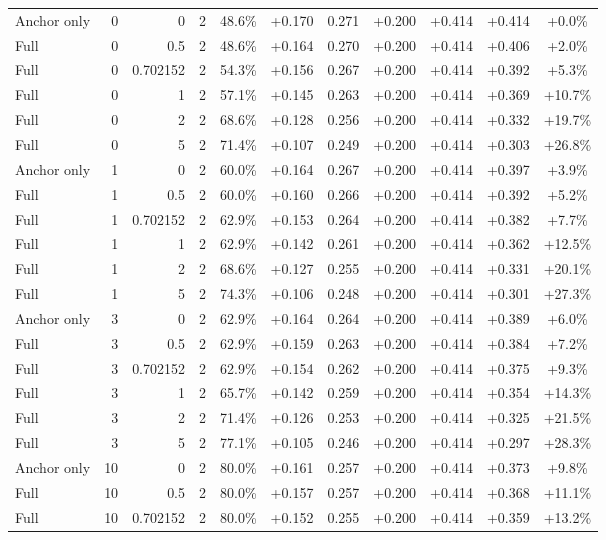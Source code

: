 \begin{table}[htbp]
\begin{tabular}{lrrrccccccc}
Anchor only & 0 & 0 & 2 & 48.6\% & +0.170 & 0.271 & +0.200 & +0.414 & +0.414 & +0.0\% \\
Full & 0 & 0.5 & 2 & 48.6\% & +0.164 & 0.270 & +0.200 & +0.414 & +0.406 & +2.0\% \\
Full & 0 & 0.702152 & 2 & 54.3\% & +0.156 & 0.267 & +0.200 & +0.414 & +0.392 & +5.3\% \\
Full & 0 & 1 & 2 & 57.1\% & +0.145 & 0.263 & +0.200 & +0.414 & +0.369 & +10.7\% \\
Full & 0 & 2 & 2 & 68.6\% & +0.128 & 0.256 & +0.200 & +0.414 & +0.332 & +19.7\% \\
Full & 0 & 5 & 2 & 71.4\% & +0.107 & 0.249 & +0.200 & +0.414 & +0.303 & +26.8\% \\
Anchor only & 1 & 0 & 2 & 60.0\% & +0.164 & 0.267 & +0.200 & +0.414 & +0.397 & +3.9\% \\
Full & 1 & 0.5 & 2 & 60.0\% & +0.160 & 0.266 & +0.200 & +0.414 & +0.392 & +5.2\% \\
Full & 1 & 0.702152 & 2 & 62.9\% & +0.153 & 0.264 & +0.200 & +0.414 & +0.382 & +7.7\% \\
Full & 1 & 1 & 2 & 62.9\% & +0.142 & 0.261 & +0.200 & +0.414 & +0.362 & +12.5\% \\
Full & 1 & 2 & 2 & 68.6\% & +0.127 & 0.255 & +0.200 & +0.414 & +0.331 & +20.1\% \\
Full & 1 & 5 & 2 & 74.3\% & +0.106 & 0.248 & +0.200 & +0.414 & +0.301 & +27.3\% \\
Anchor only & 3 & 0 & 2 & 62.9\% & +0.164 & 0.264 & +0.200 & +0.414 & +0.389 & +6.0\% \\
Full & 3 & 0.5 & 2 & 62.9\% & +0.159 & 0.263 & +0.200 & +0.414 & +0.384 & +7.2\% \\
Full & 3 & 0.702152 & 2 & 62.9\% & +0.154 & 0.262 & +0.200 & +0.414 & +0.375 & +9.3\% \\
Full & 3 & 1 & 2 & 65.7\% & +0.142 & 0.259 & +0.200 & +0.414 & +0.354 & +14.3\% \\
Full & 3 & 2 & 2 & 71.4\% & +0.126 & 0.253 & +0.200 & +0.414 & +0.325 & +21.5\% \\
Full & 3 & 5 & 2 & 77.1\% & +0.105 & 0.246 & +0.200 & +0.414 & +0.297 & +28.3\% \\
Anchor only & 10 & 0 & 2 & 80.0\% & +0.161 & 0.257 & +0.200 & +0.414 & +0.373 & +9.8\% \\
Full & 10 & 0.5 & 2 & 80.0\% & +0.157 & 0.257 & +0.200 & +0.414 & +0.368 & +11.1\% \\
Full & 10 & 0.702152 & 2 & 80.0\% & +0.152 & 0.255 & +0.200 & +0.414 & +0.359 & +13.2\% \\

\end{tabular}
\end{table}
